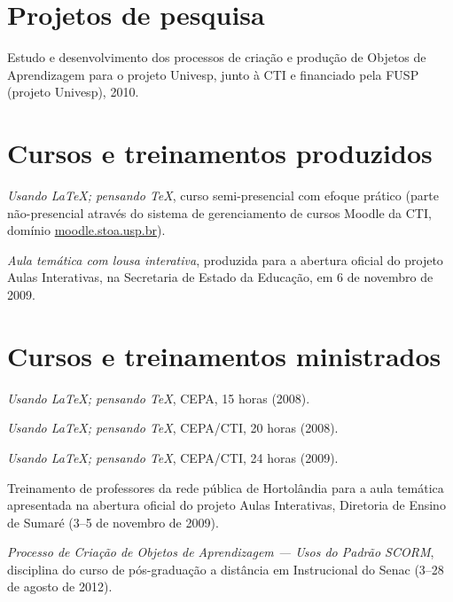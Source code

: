 \section*{Projetos de pesquisa}

\begin{compactitem}
	\item Estudo e desenvolvimento dos processos de criação e produção de Objetos de Aprendizagem para o projeto Univesp, junto à CTI e financiado pela FUSP (projeto Univesp), 2010.
\end{compactitem}

\section*{Cursos e treinamentos produzidos}

\begin{compactitem}
	\item \textsl{Usando \LaTeX; pensando \TeX}, curso semi-presencial com efoque prático (parte não-presencial através do sistema de gerenciamento de cursos Moodle da CTI, domínio \url{moodle.stoa.usp.br}).
	\item \textsl{Aula temática com lousa interativa}, produzida para a abertura oficial do projeto Aulas Interativas, na Secretaria de Estado da Educação, em 6 de novembro de 2009.
\end{compactitem}

\section*{Cursos e treinamentos ministrados}

\begin{compactitem}
	\item \textsl{Usando \LaTeX; pensando \TeX}, CEPA, 15 horas (2008).
	\item \textsl{Usando \LaTeX; pensando \TeX}, CEPA/CTI, 20 horas (2008).
	\item \textsl{Usando \LaTeX; pensando \TeX}, CEPA/CTI, 24 horas (2009).
	\item Treinamento de professores da rede pública de Hortolândia para a aula temática apresentada na abertura oficial do projeto Aulas Interativas, Diretoria de Ensino de Sumaré (3--5 de novembro de 2009).
	\item \textsl{Processo de Criação de Objetos de Aprendizagem --- Usos do Padrão SCORM}, disciplina do curso de pós-graduação a distância em  Instrucional do Senac (3--28 de agosto de 2012).
\end{compactitem}

